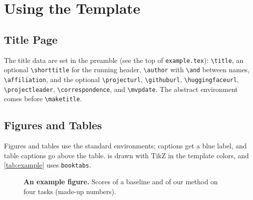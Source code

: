 \documentclass[10pt,letterpaper]{article}
\begin{document}
\section{Using the Template}
\label{sec:usage}

\subsection{Title Page}
\label{sec:usage:title}
The title data are set in the preamble (see the top of \texttt{example.tex}): \verb|\title|, an optional
\verb|\shorttitle| for the running header, \verb|\author| with \verb|\and| between names, \verb|\affiliation|, and the
optional \verb|\projecturl|, \verb|\githuburl|, \verb|\huggingfaceurl|, \verb|\projectleader|, \verb|\correspondence|,
and \verb|\mvpdate|. The abstract environment comes before \verb|\maketitle|.

\subsection{Figures and Tables}
\label{sec:usage:floats}
Figures and tables use the standard environments; captions get a blue label, and table captions go above the table.
 is drawn with TikZ in the template colors, and \cref{tab:example} uses \texttt{booktabs}.

\begin{figure}[t]
\centering
{}
\caption{\textbf{An example figure.} Scores of a baseline and of our method on four tasks (made-up numbers).}
\label{fig:example}
\end{figure}
\end{document}
